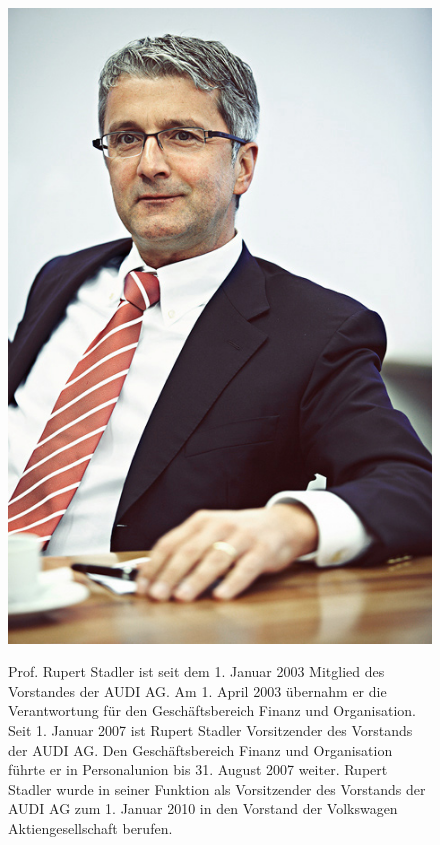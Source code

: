 \documentclass[12pt]{article}
\begin{document}
\begin{figure}[here!]
	\centering
	\begin{minipage}[h]{0.20\textwidth}
		\centering
		\includegraphics[width=1.0\textwidth]{images/RupertStadler.jpg}
		\label{fig:vorstandvw8}
		\cite{rspic}
	\end{minipage}
	\begin{minipage}[h]{0.10\textwidth}
		\hspace{1cm} 
	\end{minipage}
	\begin{minipage}[h]{0.65\textwidth}
		Prof. Rupert Stadler ist seit dem 1. Januar 2003 Mitglied des Vorstandes der AUDI AG. Am 1. April 2003 übernahm er die Verantwortung für den Geschäftsbereich Finanz und Organisation. Seit 1. Januar 2007 ist Rupert Stadler Vorsitzender des Vorstands der AUDI AG. Den Geschäftsbereich Finanz und Organisation führte er in Personalunion bis 31. August 2007 weiter. Rupert Stadler wurde in seiner Funktion als Vorsitzender des Vorstands der AUDI AG zum 1. Januar 2010 in den Vorstand der Volkswagen Aktiengesellschaft berufen. 
	\end{minipage}
\end{figure}
\cite{vorstand}
\end{document}
